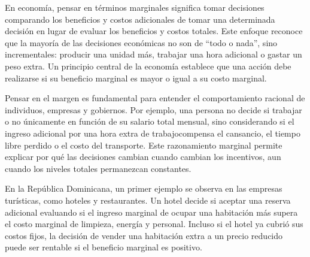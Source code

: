 \documentclass[
  letterpaper,
  DIV=11,
  numbers=noendperiod,
  oneside]{scrreprt}
\begin{document}
En economía, pensar en términos marginales significa tomar decisiones
comparando los beneficios y costos adicionales de tomar una determinada
decisión en lugar de evaluar los beneficios y costos totales. Este
enfoque reconoce que la mayoría de las decisiones económicas no son de
``todo o nada'', sino incrementales: producir una unidad más, trabajar
una hora adicional o gastar un peso extra. Un principio central de la
economía establece que una acción debe realizarse si su beneficio
marginal es mayor o igual a su costo marginal.

Pensar en el margen es fundamental para entender el comportamiento
racional de individuos, empresas y gobiernos. Por ejemplo, una persona
no decide si trabajar o no únicamente en función de su salario total
mensual, sino considerando si el ingreso adicional por una hora extra de
trabajocompensa el cansancio, el tiempo libre perdido o el costo del
transporte. Este razonamiento marginal permite explicar por qué las
decisiones cambian cuando cambian los incentivos, aun cuando los niveles
totales permanezcan constantes.

En la República Dominicana, un primer ejemplo se observa en las empresas
turísticas, como hoteles y restaurantes. Un hotel decide si aceptar una
reserva adicional evaluando si el ingreso marginal de ocupar una
habitación más supera el costo marginal de limpieza, energía y personal.
Incluso si el hotel ya cubrió sus costos fijos, la decisión de vender
una habitación extra a un precio reducido puede ser rentable si el
beneficio marginal es positivo.
\end{document}

